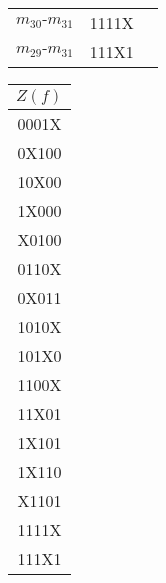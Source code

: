 \documentclass{article}
\begin{document}
\begin{center}
\begin{tabular}[t]{|lcc|}
$m_{30}\mbox{-}m_{31}$ & 1111X& \\$m_{29}\mbox{-}m_{31}$ & 111X1& \\\hline
\end{tabular}
\begin{tabular}[t]{|c|}
\hline $Z(f)$ \\ \hline
0001X\\
0X100\\
10X00\\
1X000\\
X0100\\
0110X\\
0X011\\
1010X\\
101X0\\
1100X\\
11X01\\
1X101\\
1X110\\
X1101\\
1111X\\
111X1\\
\hline \end{tabular}
\end{center}
\end{document}
